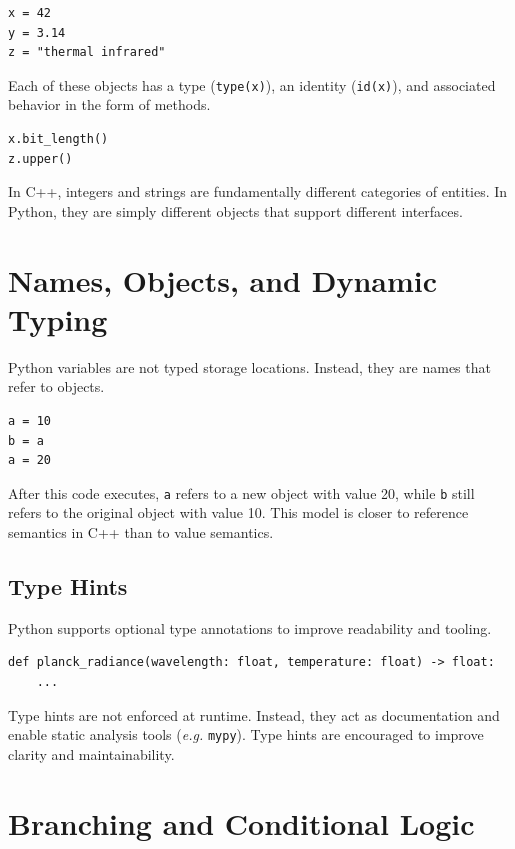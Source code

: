 \begin{verbatim}
x = 42
y = 3.14
z = "thermal infrared"
\end{verbatim}

Each of these objects has a type (\texttt{type(x)}), an identity (\texttt{id(x)}), and associated behavior in the form of methods.

\begin{verbatim}
x.bit_length()
z.upper()
\end{verbatim}

In C++, integers and strings are fundamentally different categories of entities. In Python, they are simply different objects that support different interfaces.

\section{Names, Objects, and Dynamic Typing}

Python variables are not typed storage locations. Instead, they are names that refer to objects.

\begin{verbatim}
a = 10
b = a
a = 20
\end{verbatim}

After this code executes, \texttt{a} refers to a new object with value 20, while \texttt{b} still refers to the original object with value 10. This model is closer to reference semantics in C++ than to value semantics.

\subsection{Type Hints}

Python supports optional type annotations to improve readability and tooling.

\begin{verbatim}
def planck_radiance(wavelength: float, temperature: float) -> float:
    ...
\end{verbatim}

Type hints are not enforced at runtime. Instead, they act as documentation and enable static analysis tools (\textit{e.g.} \texttt{mypy}). Type hints are encouraged to improve clarity and maintainability.

\section{Branching and Conditional Logic}

